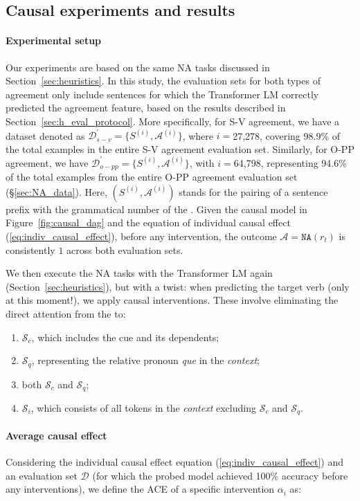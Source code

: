 \subsection{Causal experiments and results} \label{sec:causal_expe_res}
\paragraph{Experimental setup} Our experiments are based on the same NA tasks discussed in Section~\ref{sec:heuristics}. In this study, the evaluation sets for both types of agreement only include sentences for which the Transformer LM correctly predicted the agreement feature, based on the results described in Section~\ref{sec:h_eval_protocol}. More specifically, for S-V agreement, we have a dataset denoted as $\mathcal{D}^{\prime}_{s-v}=\{S^{(i)},\mathcal{A}^{(i)}\}$, where $i=$27,278, covering 98.9\% of the total examples in the entire S-V agreement evaluation set. Similarly, for O-PP agreement, we have $\mathcal{D}^{\prime}_{o-pp}=\{S^{(i)},\mathcal{A}^{(i)}\}$, with $i=$64,798, representing 94.6\% of the total examples from the entire O-PP agreement evaluation set (\S\ref{sec:NA_data}). Here, $(S^{(i)},\mathcal{A}^{(i)})$ stands for the pairing of a sentence prefix with the grammatical number of the \cue. Given the causal model in Figure~\ref{fig:causal_dag} and the equation of individual causal effect (\ref{eq:indiv_causal_effect}), before any intervention, the outcome $\mathcal{A}=\texttt{NA}(r_t)$ is consistently $1$ across both evaluation sets.

We then execute the NA tasks with the Transformer LM again (Section~\ref{sec:heuristics}), but with a twist: when predicting the target verb (only at this moment!), we apply causal interventions. These involve eliminating the direct attention from the \target to:
\begin{enumerate}[label=\roman*)]
    \item \( \mathcal{S}_{c} \), which includes the cue and its dependents;
    \item \( \mathcal{S}_{q} \), representing the relative pronoun \textit{que} in the \emph{context};
    \item both \( \mathcal{S}_{c} \) and \( \mathcal{S}_{q} \);
    \item \( \mathcal{S}_{i} \), which consists of all tokens in the \emph{context} excluding \( \mathcal{S}_{c} \) and \( \mathcal{S}_{q} \).
\end{enumerate}


\paragraph{Average causal effect} 
Considering the individual causal effect equation (\ref{eq:indiv_causal_effect}) and an evaluation set $\mathcal{D}$ (for which the probed model achieved 100\% accuracy before any interventions), we define the \ac{ACE} of a specific intervention $\alpha_i$ as:

